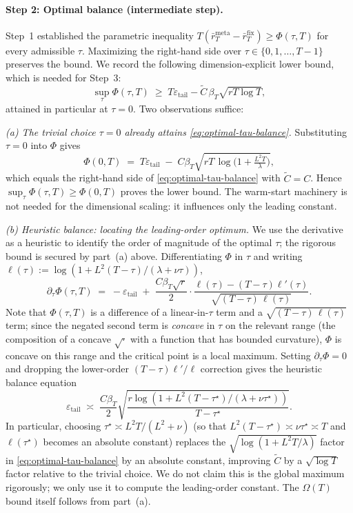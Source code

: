 \documentclass{article}
\theoremstyle{definition}
\theoremstyle{remark}
\newcommand{\meta}{\mathrm{meta}}
\newcommand{\fix}{\mathrm{fix}}
\theoremstyle{remark}
\begin{document}
\paragraph{Step 2: Optimal balance (intermediate step).}
Step~1 established the parametric inequality
$T(\bar r_T^{\meta}-\bar r_T^{\fix})\ge\Phi(\tau,T)$ for every admissible
$\tau$. Maximizing the right-hand side over $\tau\in\{0,1,\dots,T-1\}$
preserves the bound. We record the following dimension-explicit lower
bound, which is needed for Step~3:
\begin{equation}
\label{eq:optimal-tau-balance}
\sup_\tau\Phi(\tau,T) \;\ge\; T\varepsilon_{\mathrm{tail}}
- \widetilde C\,\beta_T\sqrt{rT\log T},
\end{equation}
attained in particular at $\tau=0$. Two observations suffice:

\emph{(a) The trivial choice $\tau=0$ already attains
\eqref{eq:optimal-tau-balance}.} Substituting $\tau=0$ into $\Phi$ gives
\[
\Phi(0,T)
\;=\;
T\varepsilon_{\mathrm{tail}}
\;-\;
C\beta_T\sqrt{rT\,\log\!\bigl(1+\tfrac{L^2 T}{\lambda}\bigr)},
\]
which equals the right-hand side of \eqref{eq:optimal-tau-balance} with
$\widetilde C=C$. Hence $\sup_\tau\Phi(\tau,T)\ge\Phi(0,T)$ proves the
lower bound. The warm-start machinery is not needed for the dimensional
scaling: it influences only the leading constant.

\emph{(b) Heuristic balance: locating the leading-order optimum.}
We use the derivative as a heuristic to identify the order of magnitude
of the optimal $\tau$; the rigorous bound is secured by part~(a)
above. Differentiating $\Phi$ in $\tau$ and writing
$\ell(\tau):=\log(1+L^2(T-\tau)/(\lambda+\nu\tau))$,
\[
\partial_\tau\Phi(\tau,T)
\;=\;
-\varepsilon_{\mathrm{tail}}
\;+\;
\frac{C\beta_T\sqrt{r}}{2}
\cdot
\frac{\ell(\tau)-(T-\tau)\ell'(\tau)}
{\sqrt{(T-\tau)\,\ell(\tau)}}.
\]
Note that $\Phi(\tau,T)$ is a difference of a linear-in-$\tau$ term and
a $\sqrt{(T-\tau)\,\ell(\tau)}$ term; since the negated second term is
\emph{concave} in $\tau$ on the relevant range (the composition of a
concave $\sqrt{\cdot}$ with a function that has bounded curvature),
$\Phi$ is concave on this range and the critical point is a local
maximum. Setting $\partial_\tau\Phi=0$ and dropping the lower-order
$(T-\tau)\ell'/\ell$ correction gives the heuristic balance equation
\begin{equation}
\label{eq:balance-equation}
\varepsilon_{\mathrm{tail}}
\;\asymp\;
\frac{C\beta_T}{2}
\sqrt{\frac{r\log(1+L^2(T-\tau^\star)/(\lambda+\nu\tau^\star))}{T-\tau^\star}}.
\end{equation}
In particular, choosing $\tau^\star\asymp L^2T/(L^2+\nu)$ (so that
$L^2(T-\tau^\star)\asymp\nu\tau^\star\asymp T$ and $\ell(\tau^\star)$
becomes an absolute constant) replaces the $\sqrt{\log(1+L^2T/\lambda)}$
factor in \eqref{eq:optimal-tau-balance} by an absolute constant,
improving $\widetilde C$ by a $\sqrt{\log T}$ factor relative to the
trivial choice. We do not claim this is the global maximum
rigorously; we only use it to compute the leading-order constant. The
$\Omega(T)$ bound itself follows from part~(a).
\end{document}
